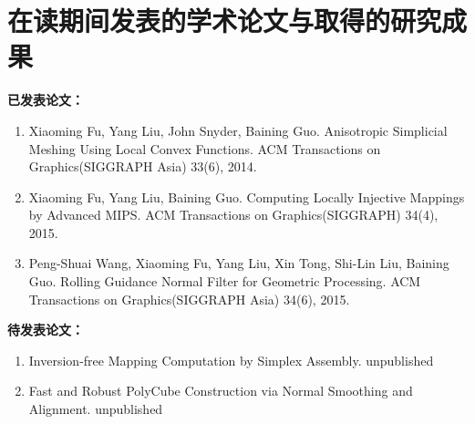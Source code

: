 ﻿
\chapter{在读期间发表的学术论文与取得的研究成果}

\noindent\textbf{已发表论文：}

\begin{enumerate}

\item Xiaoming Fu, Yang Liu, John Snyder, Baining Guo. Anisotropic Simplicial Meshing Using Local Convex Functions. ACM Transactions on Graphics(SIGGRAPH Asia) 33(6), 2014.
\item Xiaoming Fu, Yang Liu, Baining Guo. Computing Locally Injective Mappings by Advanced MIPS. ACM Transactions on Graphics(SIGGRAPH) 34(4), 2015.
\item Peng-Shuai Wang, Xiaoming Fu, Yang Liu, Xin Tong, Shi-Lin Liu, Baining Guo. Rolling Guidance Normal Filter for Geometric Processing. ACM Transactions on Graphics(SIGGRAPH Asia) 34(6), 2015.

\end{enumerate}

\vskip 1cm

\noindent\textbf{待发表论文：}

\begin{enumerate}

\item Inversion-free Mapping Computation by Simplex Assembly. unpublished
\item Fast and Robust PolyCube Construction via Normal Smoothing and Alignment. unpublished

\end{enumerate}
